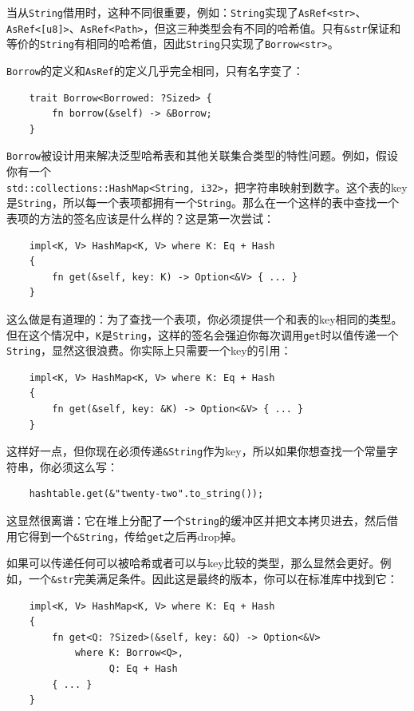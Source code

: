 当从\texttt{String}借用时，这种不同很重要，例如：\texttt{String}实现了\texttt{AsRef<str>}、\texttt{AsRef<[u8]>}、\texttt{AsRef<Path>}，但这三种类型会有不同的哈希值。只有\texttt{\&str}保证和等价的\texttt{String}有相同的哈希值，因此\texttt{String}只实现了\texttt{Borrow<str>}。

\texttt{Borrow}的定义和\texttt{AsRef}的定义几乎完全相同，只有名字变了：
\begin{verbatim}
    trait Borrow<Borrowed: ?Sized> {
        fn borrow(&self) -> &Borrow;
    }
\end{verbatim}

\texttt{Borrow}被设计用来解决泛型哈希表和其他关联集合类型的特性问题。例如，假设你有一个\\
\texttt{std::collections::HashMap<String, i32>}，把字符串映射到数字。这个表的key是\texttt{String}，所以每一个表项都拥有一个\texttt{String}。那么在一个这样的表中查找一个表项的方法的签名应该是什么样的？这是第一次尝试：
\begin{verbatim}
    impl<K, V> HashMap<K, V> where K: Eq + Hash
    {
        fn get(&self, key: K) -> Option<&V> { ... }
    }
\end{verbatim}

这么做是有道理的：为了查找一个表项，你必须提供一个和表的key相同的类型。但在这个情况中，\texttt{K}是\texttt{String}，这样的签名会强迫你每次调用\texttt{get}时以值传递一个\texttt{String}，显然这很浪费。你实际上只需要一个key的引用：
\begin{verbatim}
    impl<K, V> HashMap<K, V> where K: Eq + Hash
    {
        fn get(&self, key: &K) -> Option<&V> { ... }
    }
\end{verbatim}

这样好一点，但你现在必须传递\texttt{\&String}作为key，所以如果你想查找一个常量字符串，你必须这么写：
\begin{verbatim}
    hashtable.get(&"twenty-two".to_string());
\end{verbatim}

这显然很离谱：它在堆上分配了一个\texttt{String}的缓冲区并把文本拷贝进去，然后借用它得到一个\texttt{\&String}，传给\texttt{get}之后再drop掉。

如果可以传递任何可以被哈希或者可以与key比较的类型，那么显然会更好。例如，一个\texttt{\&str}完美满足条件。因此这是最终的版本，你可以在标准库中找到它：
\begin{verbatim}
    impl<K, V> HashMap<K, V> where K: Eq + Hash
    {
        fn get<Q: ?Sized>(&self, key: &Q) -> Option<&V>
            where K: Borrow<Q>,
                  Q: Eq + Hash
        { ... }
    }
\end{verbatim}

